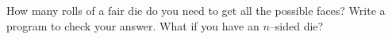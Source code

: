 How many rolls of a fair die do you need to get all the possible faces?
Write a program to check your answer.
What if you have an $n$--sided die?
